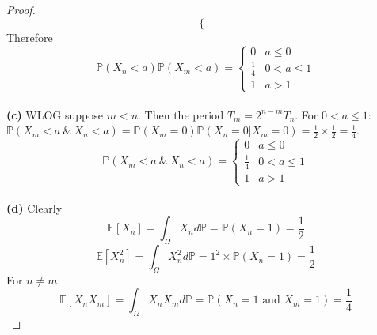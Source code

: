 \documentclass[a4paper, 10pt]{article}
\theoremstyle{definition}
\theoremstyle{hSol}
\begin{document}
\begin{proof}
\begin{equation}
\begin{cases}
	\end{cases}
\end{equation}
Therefore
\begin{equation}
	\mathbb{P}\left(X_n< a\right)\mathbb{P}\left(X_m< a\right) = \begin{cases}
	0 & a \leq 0\\
	\frac{1}{4} & 0 < a \leq 1\\
	1 & a > 1
	\end{cases}
\end{equation}
~\\
\textbf{(c)} WLOG suppose $m < n$. Then the period $T_m = 2^{n-m}T_n$. For $0<a\leq 1$: $\mathbb{P}\left(X_m < a~\&~ X_n < a\right) = \mathbb{P}\left(X_m=0\right)\mathbb{P}\left(X_n=0|X_m=0\right) = \frac{1}{2}\times \frac{1}{2}=\frac{1}{4}$.
\begin{equation}
	\mathbb{P}\left(X_m < a~\&~ X_n < a\right) = \begin{cases}
	0 & a \leq 0\\
	\frac{1}{4} & 0 < a \leq 1\\
	1 & a > 1
	\end{cases}
\end{equation}
~\\
\textbf{(d)} Clearly
$$
\mathbb{E}\left[X_n\right] = \int_{\Omega} X_n d \mathbb{P} = \mathbb{P}\left(X_n=1\right) = \frac{1}{2}
$$
$$
\mathbb{E}\left[X_n^2\right] =\int_{\Omega} X_n^2 d \mathbb{P}= 1^2 \times \mathbb{P}\left(X_n=1\right) = \frac{1}{2}
$$
For $n\ne m$:
$$
\mathbb{E}\left[X_n X_m\right] = \int_{\Omega} X_nX_m d \mathbb{P}= \mathbb{P}\left(X_n = 1 \text{ and } X_m=1\right) = \frac{1}{4}
$$
\end{proof}
\end{document}
